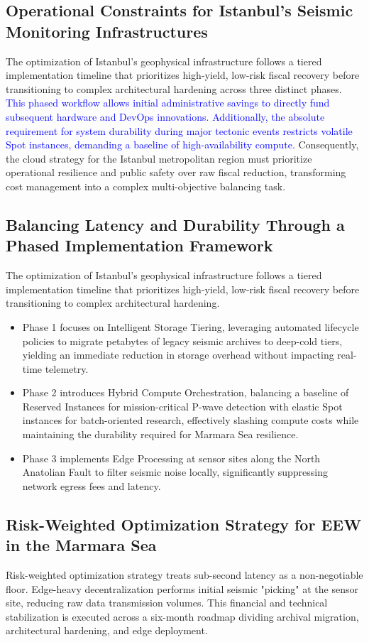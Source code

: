 \documentclass[data,article,submit,pdftex,moreauthors]{Definitions/mdpi}
\begin{document}
\subsection{Operational Constraints for Istanbul’s Seismic Monitoring Infrastructures}
The optimization of Istanbul’s geophysical infrastructure follows a tiered implementation timeline that prioritizes high-yield, low-risk fiscal recovery before transitioning to complex architectural hardening across three distinct phases. \textcolor{blue}{This phased workflow allows initial administrative savings to directly fund subsequent hardware and DevOps innovations.} \textcolor{blue}{Additionally, the absolute requirement for system durability during major tectonic events restricts volatile Spot instances, demanding a baseline of high-availability compute.} Consequently, the cloud strategy for the Istanbul metropolitan region must prioritize operational resilience and public safety over raw fiscal reduction, transforming cost management into a complex multi-objective balancing task.

\subsection{Balancing Latency and Durability Through a Phased Implementation Framework}

The optimization of Istanbul’s geophysical infrastructure follows a tiered implementation timeline that prioritizes high-yield, low-risk fiscal recovery before transitioning to complex architectural hardening.
\begin{itemize}
\item Phase 1 focuses on Intelligent Storage Tiering, leveraging automated lifecycle policies to migrate petabytes of legacy seismic archives to deep-cold tiers, yielding an immediate reduction in storage overhead without impacting real-time telemetry.
\item Phase 2 introduces Hybrid Compute Orchestration, balancing a baseline of Reserved Instances for mission-critical P-wave detection with elastic Spot instances for batch-oriented research, effectively slashing compute costs while maintaining the durability required for Marmara Sea resilience.
\item Phase 3 implements Edge Processing at sensor sites along the North Anatolian Fault to filter seismic noise locally, significantly suppressing network egress fees and latency.
\end{itemize}

\subsection{Risk-Weighted Optimization Strategy for EEW in the Marmara Sea}
Risk-weighted optimization strategy treats sub-second latency as a non-negotiable floor. Edge-heavy decentralization performs initial seismic "picking" at the sensor site, reducing raw data transmission volumes. This financial and technical stabilization is executed across a six-month roadmap dividing archival migration, architectural hardening, and edge deployment.
\end{document}

